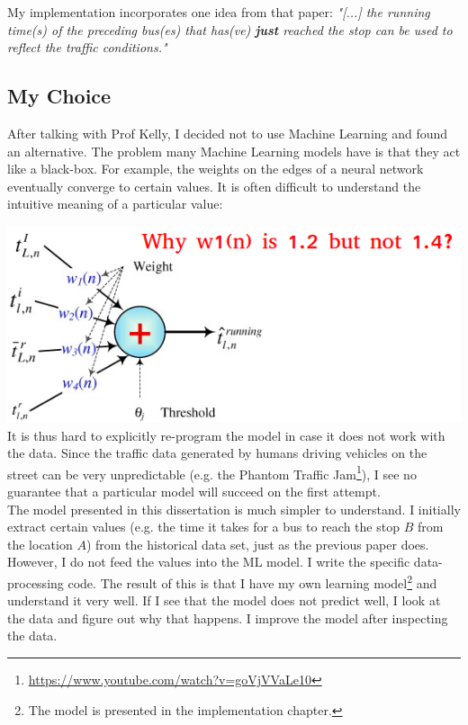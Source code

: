 \documentclass[12pt,a4paper,oneside,openright]{report}
\begin{document}
My implementation incorporates one idea from that paper:
\textit{"[...] the running time(s) of the preceding bus(es) that has(ve) \textbf{just}
reached the stop can be used to reflect the traffic conditions."} \\


\subsection{My Choice}

After talking with Prof Kelly, I decided not to use Machine Learning and found an alternative.
The problem many Machine Learning models have is that they act like a black-box. For example,
the weights on the edges of a neural network eventually converge to certain values. It is often
difficult to understand the intuitive meaning of a particular value:

\includegraphics[width=\textwidth]{figs/ann.png} \\

It is thus hard to explicitly re-program the model in case it does not work with the data.
Since the traffic data generated by humans driving vehicles on the street can be very
unpredictable (e.g. the Phantom Traffic
Jam\footnote{\textcolor{blue}{\url{https://www.youtube.com/watch?v=goVjVVaLe10}}}),
I see no guarantee that a particular model will succeed on the first attempt. \\

The model presented in this dissertation is much simpler to understand. I initially extract
certain values (e.g. the time it takes for a bus to reach the stop $B$ from the location $A$)
from the historical data set, just as the previous paper does. However, I do not feed the values
into the ML model. I write the specific data-processing code. The result of this is that
I have my own learning model\footnote{The model is presented in the
implementation chapter.} and understand it very well. If I see that the model does not predict
well, I look at the data and figure out why that happens. I improve the model after inspecting
the data. \\
\end{document}
